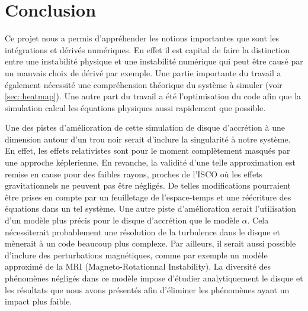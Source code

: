 \section*{Conclusion}

Ce projet nous a permis d'appréhender les notions importantes que sont les intégrations et dérivés numériques. En effet il est capital de faire la distinction entre une instabilité physique et une instabilité numérique qui peut être causé par un mauvais choix de dérivé par exemple. Une partie importante du travail a également nécessité une compréhension théorique du système à simuler (voir \ref{sec::heatmap}). Une autre part du travail a été l'optimisation du code afin que la simulation calcul les équations physiques aussi rapidement que possible.

Une des pistes d'amélioration de cette simulation de disque d’accrétion à une dimension autour d'un trou noir serait d'inclure la singularité à notre système. En effet, les effets relativistes sont pour le moment complètement masqués par une approche képlerienne. En revanche, la validité d'une telle approximation est remise en cause pour des faibles rayons, proches de l'ISCO où les effets gravitationnels ne peuvent pas être négligés. De telles modifications pourraient être prises en compte par un feuilletage de l'espace-temps et une réécriture des équations dans un tel système. Une autre piste d'amélioration serait l'utilisation d'un modèle plus précis pour le disque d'accrétion que le modèle $\alpha$. Cela nécessiterait probablement une résolution de la turbulence dans le disque et mènerait à un code beaucoup plus complexe. Par ailleurs, il serait aussi possible d'inclure des perturbations magnétiques, comme par exemple un modèle approximé de la MRI (Magneto-Rotationnal Instability). La diversité des phénomènes négligés dans ce modèle impose d'étudier analytiquement le disque et les résultats que nous avons présentés afin d'éliminer les phénomènes ayant un impact plus faible. 
